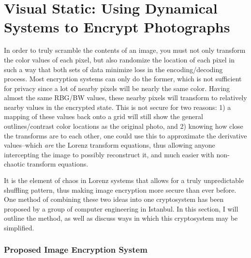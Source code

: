 \chapter{Visual Static:  Using Dynamical Systems to Encrypt Photographs }

In order to truly scramble the contents of an image, you must not only transform the color values of each pixel, but also randomize the location of each pixel in such a way that both sets of data minimize loss in the encoding/decoding process.  Most encryption systems can only do the former, which is not sufficient for privacy since a lot of nearby pixels will be nearly the same color.  Having almost the same RBG/BW values, these nearby pixels will transform to relatively nearby values in the encrypted state.  This is not secure for two reasons:  1) a mapping of these values back onto a grid will still show the general outlines/contrast color locations as the original photo, and 2) knowing how close the transforms are to each other, one could use this to approximate the derivative values--which \textit{are} the Lorenz transform equations, thus allowing anyone intercepting the image to possibly reconstruct it, and much easier with non-chaotic transform equations.

It is the element of chaos in Lorenz systems that allows for a truly unpredictable shuffling pattern, thus making image encryption more secure than ever before.  One method of combining these two ideas into one cryptosystem has been proposed by a group of computer engineering in Istanbul.  In this section, I will outline the method, as well as discuss ways in which this cryptosystem may be simplified.

\subsection{Proposed Image Encryption System}

